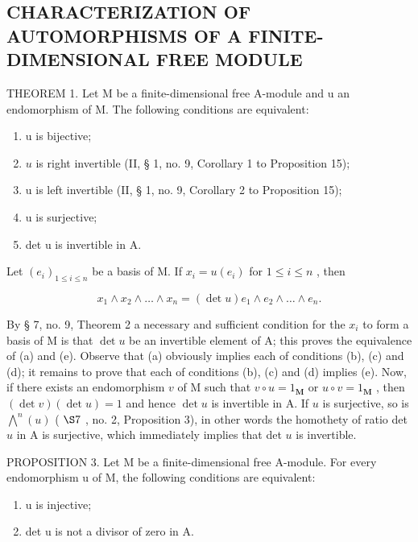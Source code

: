 \subsection{CHARACTERIZATION OF AUTOMORPHISMS OF A FINITE-DIMENSIONAL FREE MODULE}

THEOREM 1. Let M be a finite-dimensional free A-module and u an endomorphism of M. The following conditions are equivalent:

\begin{enumerate}
\def\labelenumi{(\alph{enumi})}
\item
  u is bijective;
\item
  \(u\) is right invertible (II, § 1, no. 9, Corollary 1 to Proposition 15);
\item
  u is left invertible (II, § 1, no. 9, Corollary 2 to Proposition 15);
\item
  u is surjective;
\item
  det u is invertible in A.
\end{enumerate}

Let \((e_i)_{1\leqslant i\leqslant n}\) be a basis of M. If \(x_{i} = u(e_{i})\) for \(1\leqslant i\leqslant n\) , then

\[
x _ {1} \wedge x _ {2} \wedge \dots \wedge x _ {n} = (\det u) e _ {1} \wedge e _ {2} \wedge \dots \wedge e _ {n}.
\]

By § 7, no. 9, Theorem 2 a necessary and sufficient condition for the \(x_{i}\) to form a basis of M is that \(\det u\) be an invertible element of A; this proves the equivalence of (a) and (e). Observe that (a) obviously implies each of conditions (b), (c) and (d); it remains to prove that each of conditions (b), (c) and (d) implies (e). Now, if there exists an endomorphism \(v\) of M such that \(v \circ u = 1_{\mathbf{M}}\) or \(u \circ v = 1_{\mathbf{M}}\) , then \((\det v)(\det u) = 1\) and hence \(\det u\) is invertible in A. If \(u\) is surjective, so is \(\bigwedge^{n}(u)\) ( \(\S 7\) , no. 2, Proposition 3), in other words the homothety of ratio det \(u\) in A is surjective, which immediately implies that det \(u\) is invertible.

PROPOSITION 3. Let M be a finite-dimensional free A-module. For every endomorphism u of M, the following conditions are equivalent:

\begin{enumerate}
\def\labelenumi{(\alph{enumi})}
\setcounter{enumi}{5}
\item
  u is injective;
\item
  det u is not a divisor of zero in A.
\end{enumerate}

